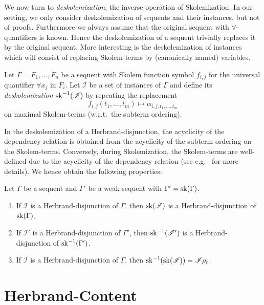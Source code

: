 \documentclass{LMCS}
\theoremstyle{plain}
\theoremstyle{definition}
\def\cI{{\mathcal I}}
\begin{document}
We now turn to \emph{deskolemization}, the inverse operation of Skolemization. In our
setting, we only consider deskolemization of sequents and their instances,
but not of proofs. Furthermore we always assume that the original sequent
with $\forall$-quantifiers is known. Hence the deskolemization of a sequent
trivially replaces it by the original sequent. More
interesting is the deskolemization of instances which will consist of
replacing Skolem-terms by (canonically named) variables.

\begin{defi}
Let $\Gamma = F_1,\ldots, F_n$ be a sequent with Skolem function symbol $f_{i,j}$
for the universal quantifier $\forall x_j$ in $F_i$. Let $\cI$ be a set of
instances of $\Gamma$ and define its \emph{deskolemization} $\sk^{-1}(\cI)$ by
repeating the replacement
\[
f_{i,j}(t_1,\ldots,t_m) \mapsto \alpha_{i,j,t_1,\ldots,t_m}
\]
on maximal Skolem-terms (w.r.t.\ the subterm ordering).
\end{defi}
In the deskolemization of a Herbrand-disjunction, the acyclicity of
the dependency relation is obtained from the acyclicity of the subterm
ordering on the Skolem-terms. Conversely, during Skolemization, the
Skolem-terms are well-defined due to the acyclicity of the dependency
relation (see
e.g.~\cite{Miller87Compact,Weller11Elimination,Baaz12Complexity} for
more details).  We hence obtain the following properties:


\begin{lem}\label{lem.desk_canonic}
Let $\Gamma$ be a sequent and $\Gamma'$ be a weak sequent with $\Gamma'=\mathrm{sk}(\Gamma)$.
\begin{enumerate}
\item If $\cI$ is a Herbrand-disjunction of $\Gamma$, then $\sk(\cI)$ is
a Herbrand-disjunction of $\mathrm{sk}(\Gamma)$.
\item If $\cI'$ is a Herbrand-disjunction of $\Gamma'$, then $\sk^{-1}(\cI')$
is a Herbrand-disjunction of $\mathrm{sk}^{-1}(\Gamma')$.
\item If $\cI$ is a Herbrand-disjunction of $\Gamma$, then
$\sk^{-1}(\sk(\cI)) = \cI\rho_\mathrm{c}$.
\end{enumerate}
\end{lem}



\section{Herbrand-Content}\label{sec.herbrand_content}
\end{document}
